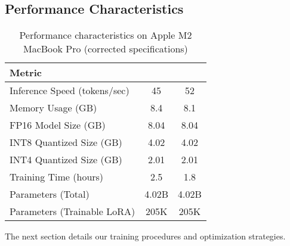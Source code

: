 \subsection{Performance Characteristics}

\begin{table}[H]
\centering
\begin{tabular}{lcc}
\toprule
Metric & \supra{} & \zennano{} \\
\midrule
Inference Speed (tokens/sec) & 45 & 52 \\
Memory Usage (GB) & 8.4 & 8.1 \\
FP16 Model Size (GB) & 8.04 & 8.04 \\
INT8 Quantized Size (GB) & 4.02 & 4.02 \\
INT4 Quantized Size (GB) & 2.01 & 2.01 \\
Training Time (hours) & 2.5 & 1.8 \\
Parameters (Total) & 4.02B & 4.02B \\
Parameters (Trainable LoRA) & 205K & 205K \\
\bottomrule
\end{tabular}
\caption{Performance characteristics on Apple M2 MacBook Pro (corrected specifications)}
\label{tab:performance}
\end{table}

The next section details our training procedures and optimization strategies.